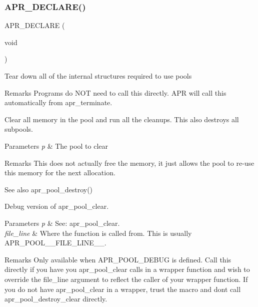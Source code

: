 \subsubsection{\texorpdfstring{A\+P\+R\+\_\+\+D\+E\+C\+L\+A\+R\+E()}{APR\_DECLARE()}\hspace{0.1cm}{\footnotesize\ttfamily [2/6]}}
{\footnotesize\ttfamily A\+P\+R\+\_\+\+D\+E\+C\+L\+A\+RE (\begin{DoxyParamCaption}\item[{void}]{ }\end{DoxyParamCaption})}

Tear down all of the internal structures required to use pools \begin{DoxyRemark}{Remarks}
Programs do N\+OT need to call this directly. A\+PR will call this automatically from apr\+\_\+terminate.
\end{DoxyRemark}
Clear all memory in the pool and run all the cleanups. This also destroys all subpools. 
\begin{DoxyParams}{Parameters}
{\em p} & The pool to clear \\
\hline
\end{DoxyParams}
\begin{DoxyRemark}{Remarks}
This does not actually free the memory, it just allows the pool to re-\/use this memory for the next allocation. 
\end{DoxyRemark}
\begin{DoxySeeAlso}{See also}
apr\+\_\+pool\+\_\+destroy()
\end{DoxySeeAlso}
Debug version of apr\+\_\+pool\+\_\+clear. 
\begin{DoxyParams}{Parameters}
{\em p} & See\+: apr\+\_\+pool\+\_\+clear. \\
\hline
{\em file\+\_\+line} & Where the function is called from. This is usually A\+P\+R\+\_\+\+P\+O\+O\+L\+\_\+\+\_\+\+F\+I\+L\+E\+\_\+\+L\+I\+N\+E\+\_\+\+\_\+. \\
\hline
\end{DoxyParams}
\begin{DoxyRemark}{Remarks}
Only available when A\+P\+R\+\_\+\+P\+O\+O\+L\+\_\+\+D\+E\+B\+UG is defined. Call this directly if you have you apr\+\_\+pool\+\_\+clear calls in a wrapper function and wish to override the file\+\_\+line argument to reflect the caller of your wrapper function. If you do not have apr\+\_\+pool\+\_\+clear in a wrapper, trust the macro and don\textquotesingle{}t call apr\+\_\+pool\+\_\+destroy\+\_\+clear directly.
\end{DoxyRemark}
